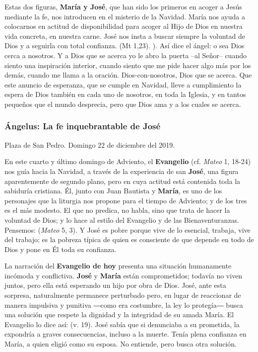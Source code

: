 \begin{body}
\begin{body}
Estas dos figuras, \textbf{María y José}, que han sido los primeros en acoger a Jesús mediante la fe, nos introducen en el misterio de la Navidad. María nos ayuda a colocarnos en actitud de disponibilidad para acoger al Hijo de Dios en nuestra vida concreta, en nuestra carne. José nos insta a buscar siempre la voluntad de Dios y a seguirla con total confianza.  (Mt 1,23). ). Así dice el ángel:  o sea Dios cerca a nosotros. Y a Dios que se acerca yo le abro la puerta --al Señor-- cuando siento una inspiración interior, cuando siento que me pide hacer algo más por los demás, cuando me llama a la oración. Dios-con-nosotros, Dios que se acerca. Que este anuncio de esperanza, que se cumple en Navidad, lleve a cumplimiento la espera de Dios también en cada uno de nosotros, en toda la Iglesia, y en tantos pequeños que el mundo desprecia, pero que Dios ama y a los cuales se acerca.

\subsubsection{Ángelus: La fe inquebrantable de José}

Plaza de San Pedro. Domingo 22 de diciembre del 2019.

En este cuarto y último domingo de Adviento, el \textbf{Evangelio} (cf. \emph{Mateo} 1, 18-24) nos guía hacia la Navidad, a través de la experiencia de san \textbf{José}, una figura aparentemente de segundo plano, pero en cuya actitud está contenida toda la sabiduría cristiana. Él, junto con Juan Bautista y \textbf{María}, es uno de los personajes que la liturgia nos propone para el tiempo de Adviento; y de los tres es el más modesto. El que no predica, no habla, sino que trata de hacer la voluntad de Dios; y lo hace al estilo del Evangelio y de las Bienaventuranzas. Pensemos:  (\emph{Mateo} 5, 3). Y José es pobre porque vive de lo esencial, trabaja, vive del trabajo; es la pobreza típica de quien es consciente de que depende en todo de Dios y pone en Él toda su confianza.

La narración del \textbf{Evangelio de hoy} presenta una situación humanamente incómoda y conflictiva. \textbf{José} y \textbf{María} están comprometidos; todavía no viven juntos, pero ella está esperando un hijo por obra de Dios. José, ante esta sorpresa, naturalmente permanece perturbado pero, en lugar de reaccionar de manera impulsiva y punitiva ―como era costumbre, la ley lo protegía― busca una solución que respete la dignidad y la integridad de su amada María. El Evangelio lo dice así:  (v. 19). José sabía que si denunciaba a su prometida, la expondría a graves consecuencias, incluso a la muerte. Tenía plena confianza en María, a quien eligió como su esposa. No entiende, pero busca otra solución.


\end{body}
\end{body}

